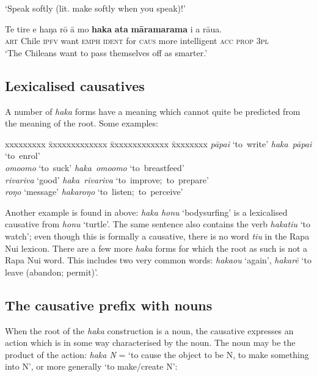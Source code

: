 \glt 
‘Speak softly (lit. make softly when you speak)!’ \textstyleExampleref{[R408.046]} 
\z

\ea\label{ex:8.250}
\gll Te tire e haŋa rō {\ꞌ}ā mo \textbf{haka} \textbf{{\ꞌ}ata} \textbf{māramarama} i a rāua. \\
\textsc{art} Chile \textsc{ipfv} want \textsc{emph} \textsc{ident} for \textsc{caus} more intelligent \textsc{acc} \textsc{prop} \textsc{3pl} \\

\glt 
‘The Chileans want to pass themselves off as smarter.’ \textstyleExampleref{[R428.006]} 
\z

\subsection{Lexicalised causatives}\label{sec:8.12.5}

A number of \textit{haka} forms have a meaning which cannot quite be predicted from the meaning of the root. Some examples:

\ea
\begin{tabbing}
xxxxxxxxx \= xxxxxxxxxxxxx \= xxxxxxxxxxxxx \= xxxxxxxx \kill
\textit{pāpa{\ꞌ}i} \>  ‘to~write’ \>  \textit{haka~pāpa{\ꞌ}i} \>  ‘to~enrol’\\
\textit{{\ꞌ}omo{\ꞌ}omo} \>  ‘to~suck’ \>  \textit{haka~{\ꞌ}omo{\ꞌ}omo} \>  ‘to~breastfeed’\\
\textit{rivariva} \>  ‘good’ \>  \textit{haka~rivariva} \>  ‘to~improve;~to~prepare’\\
\textit{roŋo} \>  ‘message’ \>  \textit{hakaroŋo} \>  ‘to~listen;~to~perceive’
\end{tabbing}
\z

Another example is found in  above: \textit{haka honu} ‘bodysurfing’ is a lexicalised causative from \textit{honu} ‘turtle’. The same sentence also contains the verb \textit{hakatiu} ‘to watch’; even though this is formally a causative, there is no word \textit{tiu} in the Rapa Nui lexicon. There are a few more \textit{haka} forms for which the root as such is not a Rapa Nui word. This includes two very common words: \textit{\mbox{haka{\ꞌ}ou}} ‘again’, \textit{hakarē} ‘to leave (abandon; permit)’. 

\subsection{The causative prefix with nouns}\label{sec:8.12.6}

When the root of the \textit{haka} construction is a noun, the causative expresses an action which is in some way characterised by the noun. The noun may be the product of the action: \textit{haka N} = ‘to cause the object to be N, to make something into N’, or more generally ‘to make/create N’:

